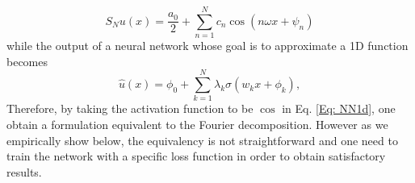 \documentclass[11pt]{article}
\begin{document}
 \begin{equation}\label{Eq: fourier_shift_1d}
     S_N u(x) = \frac{a_0}{2} + \sum_{n=1}^N c_{n} \cos(n \omega x + \psi_{n})
 \end{equation}
while the output of a neural network whose goal is to approximate a 1D function becomes 
\begin{equation}\label{Eq: NN1d}
  \hat{u}(x) = \phi_0 + \sum_{k = 1}^N \lambda_{k} \sigma\left( w_{k}x + \phi_k \right),
\end{equation}
Therefore, by taking the activation function to be $\cos$ in Eq. \ref{Eq: NN1d}, one obtain a formulation equivalent to the Fourier decomposition. However as we empirically show below, the equivalency is not straightforward and one need to train the network with a specific loss function in order to obtain satisfactory results.


\end{document}
